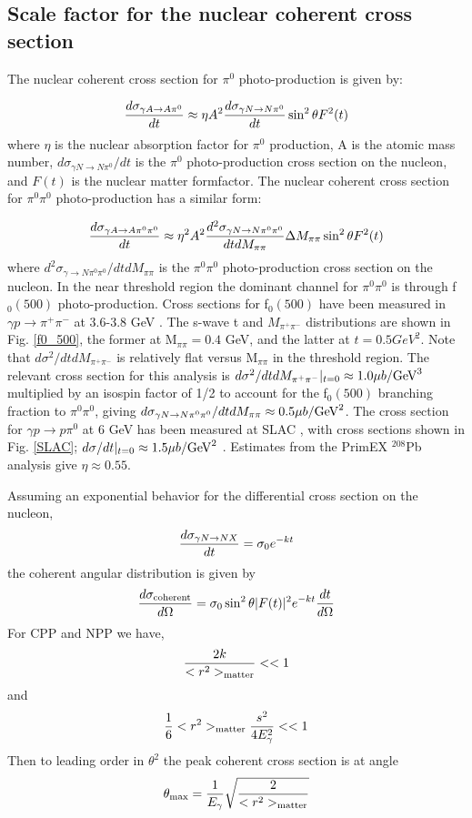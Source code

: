  \subsection{Scale factor for the nuclear coherent cross section}

The nuclear coherent cross section for  $\pi^0$ photo-production is given by: 

$$ {d\sigma_{\gamma A \rightarrow A  \pi^0 } \over dt } \approx \eta A^2 { d\sigma_{\gamma N \rightarrow N \pi^0 } \over dt }\sin^2 \theta F^2(t) $$
where $\eta$ is the nuclear absorption factor for $\pi^0$ production, A is the atomic mass number, $d\sigma_{\gamma N \rightarrow N\pi^0 } / dt$ is the $\pi^0$ photo-production cross section on the nucleon, and $F(t)$ is the nuclear matter formfactor.  The nuclear coherent cross section for  $\pi^0 \pi^0$ photo-production has a similar form: 

$$ {d\sigma_{\gamma A \rightarrow A  \pi^0 \pi^0} \over dt } \approx  \eta^2 A^2 { d^2 \sigma_{\gamma N \rightarrow N \pi^0 \pi^0} \over dt dM_{\pi \pi}}\Delta M_{\pi \pi} \sin^2 \theta F^2(t) $$
where $d^2\sigma_{\gamma \rightarrow N\pi^0 \pi^0} / dt dM_{\pi \pi}$ is the $\pi^0 \pi^0$ photo-production cross section on the nucleon.
  In the near threshold region the dominant channel for $\pi^0 \pi^0$ is through f$_0(500)$ photo-production.    Cross sections for f$_0(500)$   have been measured in 
  $\gamma p \rightarrow \pi^+ \pi^-$ at 3.6-3.8 GeV \cite{Battaglieri:2009aa}.   The s-wave t and $M_{\pi^+ \pi^-}$ distributions are shown in Fig. \ref{f0_500}, the former at M$_{\pi \pi}=0.4$ GeV, and the latter at $t=0.5 GeV^2$.  Note that  
  $d\sigma^2 / dt dM_{\pi^+ \pi^-}$ is relatively flat versus M$_{\pi \pi}$ in the threshold region. The relevant cross section for this analysis is $d\sigma^2 / dt dM_{\pi^+ \pi^-}|_{ t = 0} \approx 1.0 \mu b/{\rm GeV}^3$  multiplied by an isospin factor of 1/2 to account for the f$_0(500)$ branching fraction to $\pi^0 \pi^0$, giving $d \sigma_{\gamma N \rightarrow N \pi^0 \pi^0} / dt dM_{\pi \pi} \approx 0.5 \mu b / {\rm GeV}^2 $. The cross section for  $\gamma p \rightarrow  p \pi^0$ at 6 GeV has been measured at SLAC \cite{Anderson:1971}, with cross sections shown in Fig. \ref{SLAC};   $d\sigma / dt|_{t=0} \approx 1.5 \mu b/{\rm GeV}^2$ .   Estimates from the PrimEX $^{208}$Pb analysis give $\eta \approx 0.55$.  
  
  Assuming an exponential behavior for the differential cross section on the nucleon, 
  $$ {d\sigma_{\gamma N \rightarrow N X} \over dt} = \sigma_0 e^{-kt}$$
  the coherent angular distribution is given by
  $$ { d\sigma_{\rm coherent} \over d\Omega} = \sigma_0 \sin^2 \theta |F(t)|^2 e^{-kt} {dt \over d\Omega}$$ 
  For CPP and NPP we have, 
  $$ {2k \over <r^2>_{\rm matter}}<<1 $$
  and 
  $${1 \over 6}<r^2>_{\rm matter} {s^2 \over 4E^2_\gamma}<<1$$
   Then to leading order in $\theta^2$ the peak coherent cross section is at angle 
$$ \theta_{\rm max}={1 \over E_\gamma}\sqrt{ 2 
 \over <r^2>_{\rm matter} } $$
 
